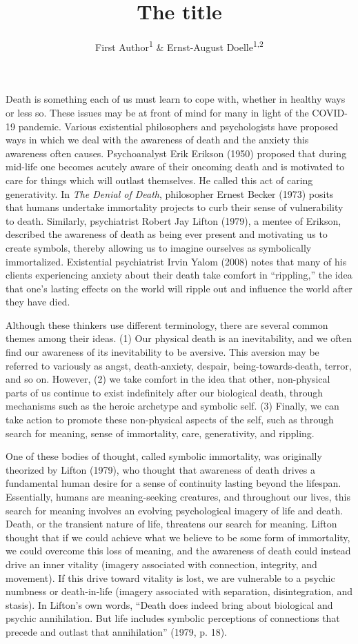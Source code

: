 \documentclass[
  english,
  man]{apa6}
\title{The title}
\author{First Author\textsuperscript{1} \& Ernst-August Doelle\textsuperscript{1,2}}
\date{}
\affiliation{\vspace{0.5cm}\textsuperscript{1} Wilhelm-Wundt-University\\\textsuperscript{2} Konstanz Business School}
\begin{document}
\maketitle

Death is something each of us must learn to cope with, whether in
healthy ways or less so. These issues may be at front of mind for many
in light of the COVID-19 pandemic. Various existential philosophers and
psychologists have proposed ways in which we deal with the awareness of
death and the anxiety this awareness often causes. Psychoanalyst Erik
Erikson (1950) proposed that during mid-life one becomes
acutely aware of their oncoming death and is motivated to care for
things which will outlast themselves. He called this act of caring
generativity. In \emph{The Denial of Death}, philosopher Ernest Becker
(1973) posits that humans undertake immortality projects to curb
their sense of vulnerability to death. Similarly, psychiatrist Robert
Jay Lifton (1979), a mentee of Erikson, described the awareness
of death as being ever present and motivating us to create symbols,
thereby allowing us to imagine ourselves as symbolically immortalized.
Existential psychiatrist Irvin Yalom (2008) notes that many of
his clients experiencing anxiety about their death take comfort in
``rippling,'' the idea that one's lasting effects on the world will ripple
out and influence the world after they have died.

Although these thinkers use different terminology, there are several
common themes among their ideas. (1) Our physical death is an
inevitability, and we often find our awareness of its inevitability to
be aversive. This aversion may be referred to variously as angst,
death-anxiety, despair, being-towards-death, terror, and so on. However,
(2) we take comfort in the idea that other, non-physical parts of us
continue to exist indefinitely after our biological death, through
mechanisms such as the heroic archetype and symbolic self. (3) Finally,
we can take action to promote these non-physical aspects of the self,
such as through search for meaning, sense of immortality, care,
generativity, and rippling.

One of these bodies of thought, called symbolic immortality, was
originally theorized by Lifton (1979), who thought that
awareness of death drives a fundamental human desire for a sense of
continuity lasting beyond the lifespan. Essentially, humans are
meaning-seeking creatures, and throughout our lives, this search for
meaning involves an evolving psychological imagery of life and death.
Death, or the transient nature of life, threatens our search for
meaning. Lifton thought that if we could achieve what we believe to be
some form of immortality, we could overcome this loss of meaning, and
the awareness of death could instead drive an inner vitality (imagery
associated with connection, integrity, and movement). If this drive
toward vitality is lost, we are vulnerable to a psychic numbness or
death-in-life (imagery associated with separation, disintegration, and
stasis). In Lifton's own words, ``Death does indeed bring about
biological and psychic annihilation. But life includes symbolic
perceptions of connections that precede and outlast that annihilation''
(1979, p. 18).
\end{document}
